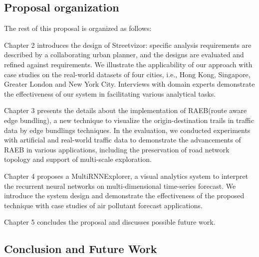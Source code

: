 \subsection{Proposal organization}


The rest of this proposal is organized as follows:

Chapter 2 introduces the design of Streetvizor: specific analysis requirements are described by a collaborating urban planner, and the designs are evaluated and refined against requirements. We illustrate the applicability of our approach with case studies on the real-world datasets of four cities, i.e., Hong Kong, Singapore, Greater London and New York City. Interviews with domain experts demonstrate the effectiveness of our system in facilitating various analytical tasks.

Chapter 3 presents the details about the implementation of RAEB(route aware edge bundling), a new technique to visualize the origin-destination trails in traffic data by edge bundlings techniques. In the evaluation, we conducted experiments with artificial and real-world traffic data to demonstrate the advancements of RAEB in various applications, including the preservation of road network topology and support of multi-scale exploration. 

Chapter 4 proposes a MultiRNNExplorer, a visual analytics system to interpret the recurrent neural networks on multi-dimensional time-series forecast. We introduce the system design and demonstrate the effectiveness of the proposed technique with case studies of air pollutant forecast applications.


Chapter 5 concludes the proposal and discusses possible future work.

\subsection{Conclusion and Future Work}

